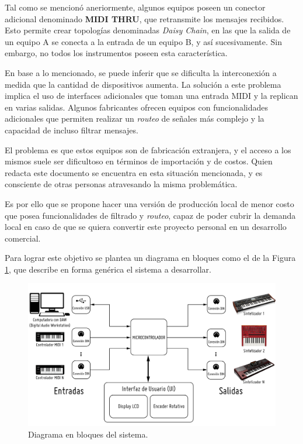 \documentclass[
11pt, %
]{charter}
\begin{document}
Tal como se mencionó aneriormente, algunos equipos poseen un conector adicional denominado \textbf{MIDI THRU}, que retransmite los mensajes recibidos. Esto permite crear topologías denominadas \emph{Daisy Chain}, en las que la salida de un equipo A se conecta a la entrada de un equipo B, y así sucesivamente. Sin embargo, no todos los instrumentos poseen esta característica.

En base a lo mencionado, se puede inferir que se dificulta la interconexión a medida que la cantidad de dispositivos aumenta. La solución a este problema implica el uso de interfaces adicionales que toman una entrada MIDI y la replican en varias salidas. Algunos fabricantes ofrecen equipos con funcionalidades adicionales que permiten realizar un \emph{routeo} de señales más complejo y la capacidad de incluso filtrar mensajes.

El problema es que estos equipos son de fabricación extranjera, y el acceso a los mismos suele ser dificultoso en términos de importación y de costos. Quien redacta este documento se encuentra en esta situación mencionada, y es consciente de otras personas atravesando la misma problemática.

Es por ello que se propone hacer una versión de producción local de menor costo que posea funcionalidades de filtrado y \emph{routeo}, capaz de poder cubrir la demanda local en caso de que se quiera convertir este proyecto personal en un desarrollo comercial.

Para lograr este objetivo se plantea un diagrama en bloques como el de la Figura \ref{fig:diagBloques}, que describe en forma genérica el sistema a desarrollar.

\begin{figure}[htpb]
	\centering 
	\includegraphics[width=\textwidth]{./Figuras/cese-pf-diagrama.png}
	\caption{Diagrama en bloques del sistema.}
	\label{fig:diagBloques}
\end{figure}
\end{document}
